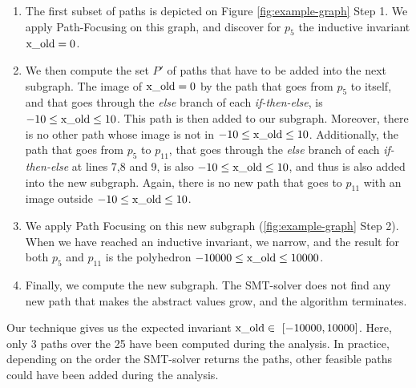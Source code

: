 \documentclass[preprint]{sigplanconf}
\begin{document}
\begin{enumerate}
	\item The first subset of paths is depicted on Figure
		\ref{fig:example-graph} Step 1. We apply Path-Focusing on this graph,
		and discover for $p_5$ the inductive invariant $\lstinline|x_old| = 0$.
	\item
		We then compute the set $P'$ of paths that have to be added into the
		next subgraph. 
		The image of $\lstinline|x_old| = 0$ by the path that goes from $p_5$ to
		itself, and that goes through the \emph{else} branch of each 
		\emph{if-then-else}, is $-10 \leq \lstinline|x_old| \leq 10$. This path
		is then added to our subgraph. Moreover, there is no other path whose
		image is not in $-10 \leq \lstinline|x_old| \leq 10$.
		Additionally, the path that goes from $p_5$ to
		$p_11$, that goes through the \emph{else} branch of each 
		\emph{if-then-else} at lines 7,8 and 9, is also 
		$-10 \leq \lstinline|x_old| \leq 10$, and thus is also added into the
		new subgraph. Again, there is no new path that goes to $p_11$ with an
		image outside $-10 \leq \lstinline|x_old| \leq 10$.
	\item
		We apply Path Focusing on this new subgraph (\ref{fig:example-graph}
		Step 2). When we have reached an inductive invariant, we narrow, and the
		result for both $p_5$ and $p_11$ is the polyhedron 
		$-10000 \leq \lstinline|x_old| \leq 10000$.
	\item Finally, we compute the new subgraph. The SMT-solver does not find any
		new path that makes the abstract values grow, and the algorithm
		terminates.
\end{enumerate}

Our technique gives us the expected invariant 
$\lstinline|x_old| \in~[-10000,\allowbreak 10000]$. 
Here, only 3 paths over the 25 have been computed during the analysis. In
practice, depending on the order the SMT-solver returns the paths, other
feasible paths could have been added during the analysis.
\end{document}
